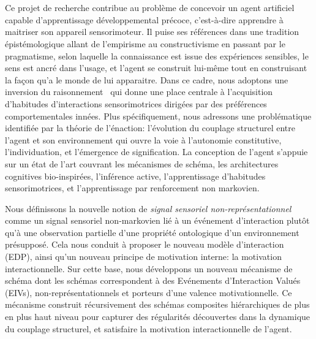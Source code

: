\chapter*{}
\vspace{-1.5cm}
    \begin{minipage}[r]{.95\textwidth}\raggedleft
    \HUGE\bfseries\AbstractName
    \end{minipage}
\vspace{2.5cm}


\noindent
Ce projet de recherche contribue au problème de concevoir un agent artificiel capable d'apprentissage développemental précoce, c'est-à-dire apprendre à maitriser son appareil sensorimoteur.
Il puise ses références dans une tradition épistémologique allant de l'empirisme au constructivisme en passant par le pragmatisme, selon laquelle la connaissance est issue des expériences sensibles, le sens est ancré dans l'usage, et l'agent se construit lui-même tout en construisant la façon qu'a le monde de lui apparaitre. 
Dans ce cadre, nous adoptons une \og inversion du raisonnement \fg\ qui donne une place centrale à l'acquisition d'habitudes d'interactions sensorimotrices dirigées par des préférences comportementales innées. 
Plus spécifiquement, nous adressons une problématique identifiée par la théorie de l'énaction: l'évolution du couplage structurel entre l'agent et son environnement qui ouvre la voie à l'autonomie constitutive, l'individuation, et l'émergence de signification.
La conception de l'agent s'appuie sur un état de l'art couvrant les mécanismes de schéma, les architectures cognitives bio-inspirées, l'inférence active, l'apprentissage d'habitudes sensorimotrices, et l'apprentissage par renforcement non markovien. 

Nous définissons la nouvelle notion de \emph{signal sensoriel non-représentationnel} comme un signal sensoriel non-markovien lié à un événement d'interaction plutôt qu'à une observation partielle d'une propriété ontologique d'un environnement présupposé. 
Cela nous conduit à proposer le nouveau modèle d'interaction  (EDP), ainsi qu'un nouveau principe de motivation interne: la motivation interactionnelle.
Sur cette base, nous développons un nouveau mécanisme de schéma dont les schémas correspondent à des Evénements d'Interaction Valués (EIVs), non-représentationnels et porteurs d'une valence motivationnelle. 
Ce mécanisme construit récursivement des schémas composites hiérarchiques de plus en plus haut niveau pour capturer des régularités découvertes dans la dynamique du couplage structurel, et satisfaire la motivation interactionnelle de l'agent.   

